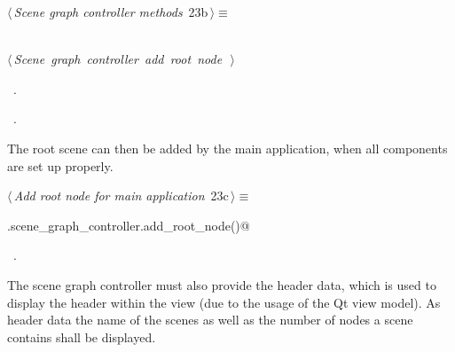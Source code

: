 \documentclass[
    a4paper,      %
    10pt,         %
    openright,    %
    notitlepage,  %
    parskip=half, %
]{scrreprt}       %
\theoremstyle{definition}                    %
\begin{document}
\begin{flushleft} \small
\begin{minipage}{\linewidth}\label{scrap19}\raggedright\small
{} $\langle\,${\itshape Scene graph controller methods}\nobreak\ {\footnotesize {23b}}$\,\rangle\equiv$
\vspace{-1exm}
\begin{list}{}{} \item
\mbox{}\lstinline@@\\
\mbox{}\lstinline@@\hbox{$\langle\,${\itshape Scene graph controller add root node}\nobreak\ {\footnotesize {}}$\,\rangle$}\lstinline@@\\
\mbox{}\lstinline@@{\NWsep}
\end{list}
\vspace{-1.5ex}
\footnotesize
\begin{list}{}{\setlength{\itemsep}{-\parsep}\setlength{\itemindent}{-\leftmargin}}
\item \NWtxtMacroDefBy\ .
\item \NWtxtMacroRefIn\ .

\item{}
\end{list}
\end{minipage}\vspace{4ex}
\end{flushleft}
The root scene can then be added by the main application, when all components
are set up properly.

\begin{flushleft} \small
\begin{minipage}{\linewidth}\label{scrap20}\raggedright\small
{} $\langle\,${\itshape Add root node for main application}\nobreak\ {\footnotesize {23c}}$\,\rangle\equiv$
\vspace{-1exm}
\begin{list}{}{} \item
\mbox{}\lstinline@self.scene_graph_controller.add_root_node()@{\NWsep}
\end{list}
\vspace{-1.5ex}
\footnotesize
\begin{list}{}{\setlength{\itemsep}{-\parsep}\setlength{\itemindent}{-\leftmargin}}
\item \NWtxtMacroRefIn\ .

\item{}
\end{list}
\end{minipage}\vspace{4ex}
\end{flushleft}
The scene graph controller must also provide the header data, which is used to
display the header within the view (due to the usage of the Qt view
model). As header data the name of the
scenes as well as the number of nodes a scene contains shall be displayed.
\end{document}
